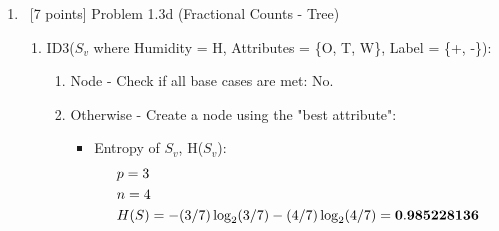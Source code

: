 \documentclass[8pt, fullpage,letterpaper]{article}
\begin{document}
\begin{enumerate}
\begin{enumerate}
\begin{enumerate}
\begin{enumerate}
\begin{itemize}
					\centerline{}	
		
				\end{itemize}	
			\end{enumerate}

	\end{enumerate}
\color{black}
\item~[7 points] Problem 1.3d  (Fractional Counts - Tree)

	\color{violet}
	\begin{enumerate}

	 	\item ID3($S_v$ where Humidity = H, Attributes = \{O, T, W\}, Label = \{+, -\}): 
			\begin{enumerate}
			\item Node - Check if all base cases are met: {\color{red} No}.
			\item Otherwise - Create a node using the "best attribute":
				\begin{itemize}
					\item Entropy of $S_v$, H($S_v$):
						\begin{align*}
						    	& p = 3\\
							& n = 4 \\
						    	& H(S) = - (3/7) \log_2 (3/7) - (4/7) \log_2 (4/7) = {\bf 0.985228136}
					      \end{align*}


\end{itemize}
\end{enumerate}
\end{enumerate}
\end{enumerate}
\end{enumerate}
\end{document}
